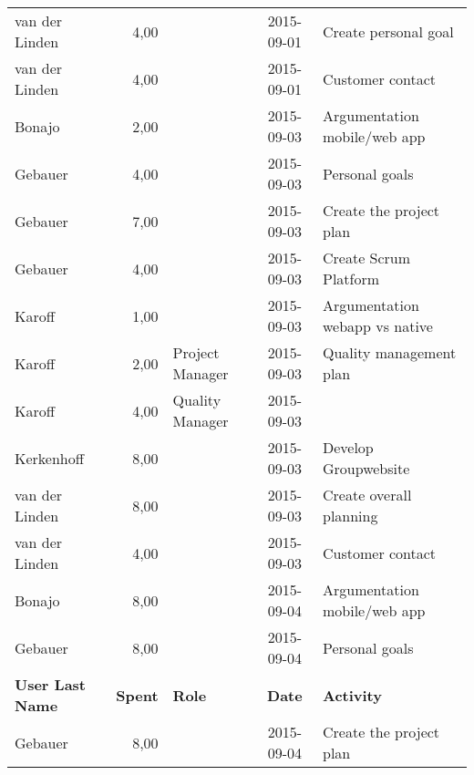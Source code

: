 \begin{longtable}{ l r p{2cm} c p{4cm}}
		\hline
		van der Linden          & 4,00           &                 & 2015-09-01    & Create personal goal                            \\
		van der Linden          & 4,00           &                 & 2015-09-01    & Customer contact                                \\
		Bonajo                  & 2,00           &                 & 2015-09-03    & Argumentation mobile/web app                    \\
		Gebauer                 & 4,00           &                 & 2015-09-03    & Personal goals                                  \\
		Gebauer                 & 7,00           &                 & 2015-09-03    & Create the project plan                         \\
		Gebauer                 & 4,00           &                 & 2015-09-03    & Create Scrum Platform                           \\
		Karoff                  & 1,00           &                 & 2015-09-03    & Argumentation webapp vs native                  \\
		Karoff                  & 2,00           & Project Manager & 2015-09-03    & Quality management plan                         \\
		Karoff                  & 4,00           & Quality Manager & 2015-09-03    &                                                 \\
		Kerkenhoff              & 8,00           &                 & 2015-09-03    & Develop Groupwebsite                            \\
		van der Linden          & 8,00           &                 & 2015-09-03    & Create overall planning                         \\
		van der Linden          & 4,00           &                 & 2015-09-03    & Customer contact                                \\
		Bonajo                  & 8,00           &                 & 2015-09-04    & Argumentation mobile/web app                    \\
		Gebauer                 & 8,00           &                 & 2015-09-04    & Personal goals                                  \\
		\textbf{User Last Name} & \textbf{Spent} & \textbf{Role} & \textbf{Date} & \textbf{Activity} \\
		\hline
		Gebauer                 & 8,00           &                 & 2015-09-04    & Create the project plan                         \\

\end{longtable}
